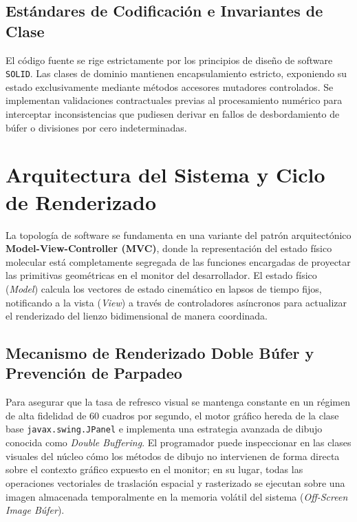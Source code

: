 \documentclass[11pt,a4paper]{article}
\begin{document}
	\subsection{Estándares de Codificación e Invariantes de Clase}
	El código fuente se rige estrictamente por los principios de diseño de software \texttt{SOLID}. Las clases de dominio mantienen encapsulamiento estricto, exponiendo su estado exclusivamente mediante métodos accesores mutadores controlados. Se implementan validaciones contractuales previas al procesamiento numérico para interceptar inconsistencias que pudiesen derivar en fallos de desbordamiento de búfer o divisiones por cero indeterminadas.
	
	\section{Arquitectura del Sistema y Ciclo de Renderizado}
	La topología de software se fundamenta en una variante del patrón arquitectónico \textbf{Model-View-Controller (MVC)}, donde la representación del estado físico molecular está completamente segregada de las funciones encargadas de proyectar las primitivas geométricas en el monitor del desarrollador. El estado físico (\textit{Model}) calcula los vectores de estado cinemático en lapsos de tiempo fijos, notificando a la vista (\textit{View}) a través de controladores asíncronos para actualizar el renderizado del lienzo bidimensional de manera coordinada.
	
	\subsection{Mecanismo de Renderizado Doble Búfer y Prevención de Parpadeo}
	Para asegurar que la tasa de refresco visual se mantenga constante en un régimen de alta fidelidad de 60 cuadros por segundo, el motor gráfico hereda de la clase base \texttt{javax.swing.JPanel} e implementa una estrategia avanzada de dibujo conocida como \textit{Double Buffering}. El programador puede inspeccionar en las clases visuales del núcleo cómo los métodos de dibujo no intervienen de forma directa sobre el contexto gráfico expuesto en el monitor; en su lugar, todas las operaciones vectoriales de traslación espacial y rasterizado se ejecutan sobre una imagen almacenada temporalmente en la memoria volátil del sistema (\textit{Off-Screen Image Búfer}).
	
\end{document}
